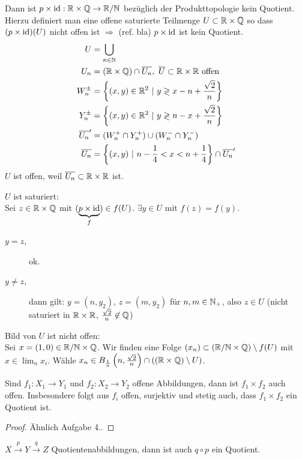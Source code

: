\begin{stz}
\begin{bsp}
        Dann ist $p\times\operatorname{id}:\mathbb{R}\times\mathbb{Q}\to\mathbb{R}/\mathbb{N}$ bezüglich der Produkttopologie
        kein Quotient. Hierzu definiert man eine offene saturierte Teilmenge
        $U\subset\mathbb{R}\times\mathbb{Q}$ so dass $(p\times\operatorname{id})(U)$ nicht offen ist
        $\Rightarrow$ (ref. bla) $p\times\operatorname{id}$ ist kein Quotient.
        \begin{align}
            U &= \bigcup_{n\in\N} \\
            U_n &= (\R\times\Q)\cap \overline{U_n},\ \overline{U}
                    \subset\R\times\R \text{ offen} \\
            W_n^\pm &= \mdef[(x,y)\in\R^2]{y \gtrless x - n +
                    \frac{\sqrt 2}{n}} \\
            Y_n^\pm &= \mdef[(x,y)\in\R^2]{y \gtrless n - x +
                    \frac{\sqrt 2}{n}} \\
            \overline{U_n}' &= (W^+_n \cap Y^+_n) \cup (W^-_n \cap Y^-_n) \\
            \overline{U_n} &= \mdef[(x,y)]{n-\frac{1}{4}<x<n+\frac{1}{4}} \cap
                    \overline{U_n}'
        \end{align}
        $U$ ist offen, weil $\overline{U_n} \subset \mathbb{R}\times\mathbb{R}$ ist.

        $U$ ist saturiert:\\
        Sei $z\in\mathbb{R}\times\mathbb{Q}$ mit $(\underset{f}{\underbrace{p\times\operatorname{id}}})\in
        f(U)$. $\exists y\in U$ mit $f(z) = f(y)$.
        \begin{description}
            \item[$y=z$,] ok.
            \item[$y\neq z$,] dann gilt: $y = (n, y_2)$, $z = (m,y_2)$ für
                $n,m\in\mathbb{N}_+$, also $z\in U$ (nicht saturiert in $\mathbb{R}\times\mathbb{R}$,
                $\frac{\sqrt 2}{n}\not\in\mathbb{Q}$)
        \end{description}

        Bild von $U$ ist nicht offen:\\
        Sei $x=(1,0)\in\mathbb{R}/\mathbb{N}\times\mathbb{Q}$. Wir finden eine Folge
        $(x_n)\subset(\mathbb{R}/\mathbb{N}\times\mathbb{Q})\setminus f(U)$ mit $x\in\lim_n x_i$. Wähle
        $x_n\in B_{\frac{1}{n}}\left( n, \frac{\sqrt 2}{n} \right)\cap (
        (\mathbb{R}\times\mathbb{Q})\setminus U)$.
    \end{bsp}
\end{stz}

\begin{stz}
    Sind $f_1:X_1\to Y_1$ und $f_2:X_2\to Y_2$ offene Abbildungen, dann ist
    $f_1\times f_2$ auch offen. Insbesondere folgt aus $f_i$ offen, surjektiv
    und stetig auch, dass $f_1\times f_2$ ein Quotient ist.
    \begin{proof}
        Ähnlich Aufgabe 4..
    \end{proof}
\end{stz}
\begin{stz}
    $X\overset{p}{\to}Y\overset{q}{\to}Z$ Quotientenabbildungen, dann ist auch
    $q\circ p$ ein Quotient.
\end{stz}

